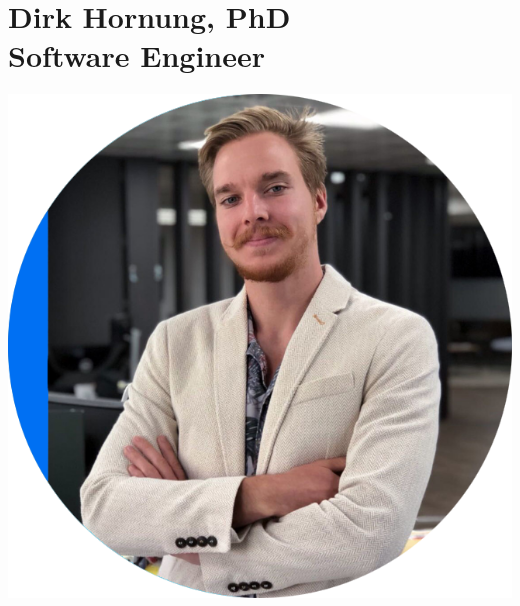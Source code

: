 \documentclass[11pt]{article}
\begin{document}
\begin{minipage}[t]{0.25\textwidth}
  \section*{Dirk Hornung, PhD \\
   Software Engineer}


  \vspace{0.8cm}

  \includegraphics[width=\linewidth]{dirkRound.png}

  \vspace{1.1cm}

  \begin{footnotesize}
  \end{footnotesize}


\end{minipage}
\end{document}
